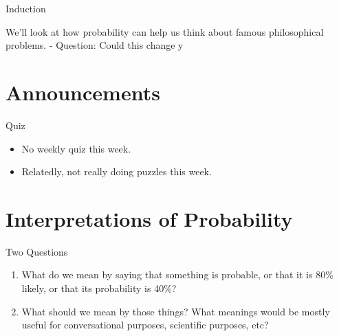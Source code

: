 \documentclass[
  ignorenonframetext,
]{beamer}
\providecommand{\tightlist}{%
  \setlength{\itemsep}{0pt}\setlength{\parskip}{0pt}}
\renewcommand{\,}{\text{, }}
\begin{document}
\begin{frame}{Induction}
\protect\hypertarget{induction-1}{}

We'll look at how probability can help us think about famous
philosophical problems. - Question: Could this change y

\end{frame}

\hypertarget{announcements}{%
\section{Announcements}\label{announcements}}

\begin{frame}{Quiz}
\protect\hypertarget{quiz}{}

\begin{itemize}
\tightlist
\item
  No weekly quiz this week.
\item
  Relatedly, not really doing puzzles this week.
\end{itemize}

\end{frame}

\hypertarget{interpretations-of-probability}{%
\section{Interpretations of
Probability}\label{interpretations-of-probability}}

\begin{frame}{Two Questions}
\protect\hypertarget{two-questions}{}

\begin{enumerate}
\tightlist
\item
  What do we mean by saying that something is probable, or that it is
  80\% likely, or that its probability is 40\%? \pause
\item
  What should we mean by those things? What meanings would be mostly
  useful for conversational purposes, scientific purposes, etc?
\end{enumerate}

\end{frame}
\end{document}

